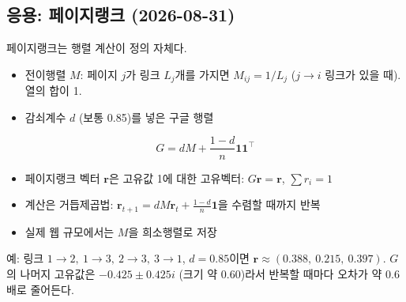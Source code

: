 \subsection{응용: 페이지랭크 (2026-08-31)}

페이지랭크는 행렬 계산이 정의 자체다.

\begin{itemize}
\tightlist
\item
  전이행렬 \(M\): 페이지 \(j\)가 링크 \(L_j\)개를 가지면
  \(M_{ij}=1/L_j\) (\(j\to i\) 링크가 있을 때). 열의 합이 1.
\item
  감쇠계수 \(d\) (보통 0.85)를 넣은 구글 행렬
\end{itemize}

\[
G=dM+\frac{1-d}{n}\mathbf 1\mathbf 1^{\top}
\]

\begin{itemize}
\tightlist
\item
  페이지랭크 벡터 \(\mathbf r\)은 고유값 1에 대한 고유벡터:
  \(G\mathbf r=\mathbf r\), \(\sum r_i=1\)
\item
  계산은 거듭제곱법:
  \(\mathbf r_{t+1}=dM\mathbf r_t+\frac{1-d}{n}\mathbf 1\)을 수렴할
  때까지 반복
\item
  실제 웹 규모에서는 \(M\)을 희소행렬로 저장
\end{itemize}

예: 링크 \(1\to2,\ 1\to3,\ 2\to3,\ 3\to1\), \(d=0.85\)이면
\(\mathbf r\approx(0.388,\ 0.215,\ 0.397)\). \(G\)의 나머지 고유값은
\(-0.425\pm0.425i\) (크기 약 0.60)라서 반복할 때마다 오차가 약 0.6배로
줄어든다.
